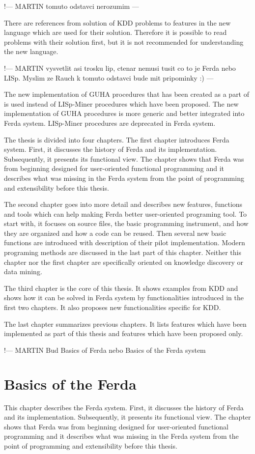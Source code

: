 \documentclass[a4paper,12pt]{book}
\begin{document}
!--- MARTIN tomuto odstavci nerozumim ---

There are references from solution of KDD problems to features in the new language which are used for their solution. Therefore it is possible to read problems with their solution first, but it is not recommended for understanding the new language.

!--- MARTIN vysvetlit asi trosku lip, ctenar nemusi tusit co to je Ferda nebo LISp. Myslim ze Rauch k tomuto odstavci bude mit pripominky :) ---

The new implementation of GUHA procedures that has been created as a part of \cite[diploma thesis of Tomáš Kuchař]{thesisKuchar} is used instead of LISp-Miner procedures which have been proposed. The new implementation of GUHA procedures is more generic and better integrated into Ferda system. LISp-Miner procedures are deprecated in Ferda system.

The thesis is divided into four chapters. The first chapter introduces Ferda system. First, it discusses the history of Ferda and its implementation. Subsequently, it presents its functional view. The chapter shows that Ferda was from beginning designed for user-oriented functional programming and it describes what was missing in the Ferda system from the point of programming and extensibility before this thesis.

The second chapter goes into more detail and describes new features, functions and tools which can help making Ferda better user-oriented programing tool. To start with, it focuses on source files, the basic programming instrument, and how they are organized and how a code can be reused. Then several new basic functions are introduced with description of their pilot implementation. Modern programing methods are discussed in the last part of this chapter. Neither this chapter nor the first chapter are specifically oriented on knowledge discovery or data mining.

The third chapter is the core of this thesis. It shows examples from KDD and shows how it can be solved in Ferda system by functionalities introduced in the first two chapters. It also proposes new functionalities specific for KDD.

The last chapter summarizes previous chapters. It lists features which have been implemented as part of this thesis and features which have been proposed only.

!--- MARTIN Bud Basics of Ferda nebo Basics of the Ferda system

\chapter{Basics of the Ferda}
This chapter describes the Ferda system. First, it discusses the history of Ferda and its implementation. Subsequently, it presents its functional view. The chapter shows that Ferda was from beginning designed for user-oriented functional programming and it describes what was missing in the Ferda system from the point of programming and extensibility before this thesis.
\end{document}
